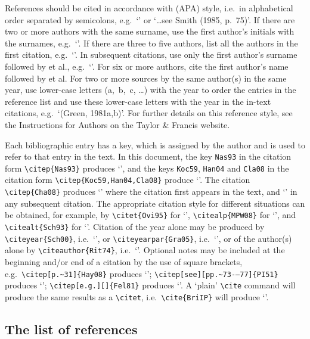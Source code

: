 \documentclass[]{interact}
\theoremstyle{plain}%
\theoremstyle{definition}
\theoremstyle{remark}
\begin{document}
References should be cited in accordance with \citeauthor{APA10} (APA) style, i.e.\ in alphabetical order separated by semicolons, e.g.\ `\citep{Ban77,Pia88,VL07}' or `\ldots see Smith (1985, p.~75)'. If there are two or more authors with the same surname, use the first author's initials with the surnames, e.g.\ `\citep{Lig08,Lig06}'. If there are three to five authors, list all the authors in the first citation, e.g.\ `\citep{GSSM91}'. In subsequent citations, use only the first author's surname followed by et al., e.g.\ `\citep{GSSM91}'. For six or more authors, cite the first author's name followed by et al. For two or more sources by the same author(s) in the same year, use lower-case letters (a,~b,~c, \ldots) with the year to order the entries in the reference list and use these lower-case letters with the year in the in-text citations, e.g.\ `(Green, 1981a,b)'. For further details on this reference style, see the Instructions for Authors on the Taylor \& Francis website.

Each bibliographic entry has a key, which is assigned by the author and is used to refer to that entry in the text. In this document, the key \verb"Nas93" in the citation form \verb"\citep{Nas93}" produces `\citep{Nas93}', and the keys \verb"Koc59", \verb"Han04" and \verb"Cla08" in the citation form \verb"\citep{Koc59,Han04,Cla08}" produce `\citep{Koc59,Han04,Cla08}'. The citation \verb"\citep{Cha08}" produces `\citep{Cha08}' where the citation first appears in the text, and `\citep{Cha08}' in any subsequent citation. The appropriate citation style for different situations can be obtained, for example, by \verb"\citet{Ovi95}" for `\citet{Ovi95}', \verb"\citealp{MPW08}" for `\citealp{MPW08}', and \verb"\citealt{Sch93}" for `\citealt{Sch93}'. Citation of the year alone may be produced by \verb"\citeyear{Sch00}", i.e.\ `\citeyear{Sch00}', or \verb"\citeyearpar{Gra05}", i.e.\ `\citeyearpar{Gra05}', or of the author(s) alone by \verb"\citeauthor{Rit74}", i.e.\ `\citeauthor{Rit74}'. Optional notes may be included at the beginning and/or end of a citation by the use of square brackets, e.g.\ \verb"\citep[p.~31]{Hay08}" produces `\citep[p.~31]{Hay08}'; \verb"\citep[see][pp.~73-–77]{PI51}" produces `\citep[see][pp.~73--77]{PI51}'; \verb"\citep[e.g.][]{Fel81}" produces `\citep[e.g.][]{Fel81}'. A `plain' \verb"\cite" command will produce the same results as a \verb"\citet", i.e.\ \verb"\cite{BriIP}" will produce `\cite{BriIP}'.


\subsection{The list of references}
\end{document}
